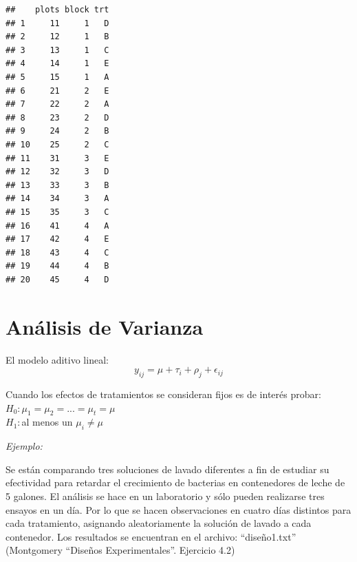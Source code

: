 \documentclass[]{book}
\newenvironment{Shaded}{\begin{snugshade}}{\end{snugshade}}
\newcommand{\KeywordTok}[1]{\textcolor[rgb]{0.13,0.29,0.53}{\textbf{#1}}}
\newcommand{\DataTypeTok}[1]{\textcolor[rgb]{0.13,0.29,0.53}{#1}}
\newcommand{\DecValTok}[1]{\textcolor[rgb]{0.00,0.00,0.81}{#1}}
\newcommand{\StringTok}[1]{\textcolor[rgb]{0.31,0.60,0.02}{#1}}
\newcommand{\CommentTok}[1]{\textcolor[rgb]{0.56,0.35,0.01}{\textit{#1}}}
\newcommand{\OperatorTok}[1]{\textcolor[rgb]{0.81,0.36,0.00}{\textbf{#1}}}
\newcommand{\NormalTok}[1]{#1}
\begin{document}
\begin{Shaded}
\end{Shaded}

\begin{verbatim}
##    plots block trt
## 1     11     1   D
## 2     12     1   B
## 3     13     1   C
## 4     14     1   E
## 5     15     1   A
## 6     21     2   E
## 7     22     2   A
## 8     23     2   D
## 9     24     2   B
## 10    25     2   C
## 11    31     3   E
## 12    32     3   D
## 13    33     3   B
## 14    34     3   A
## 15    35     3   C
## 16    41     4   A
## 17    42     4   E
## 18    43     4   C
## 19    44     4   B
## 20    45     4   D
\end{verbatim}

\section{Análisis de Varianza}\label{analisis-de-varianza-1}

El modelo aditivo lineal: \[y_{ij}=\mu + \tau_i+\rho_j+\epsilon_{ij}\]

Cuando los efectos de tratamientos se consideran fijos es de interés
probar:\\
\(H_0:\mu_1=\mu_2=... =\mu_t=\mu\)\\
\(H_1:\)al menos un \(\mu_i \neq \mu\)

\emph{Ejemplo:}

Se están comparando tres soluciones de lavado diferentes a fin de
estudiar su efectividad para retardar el crecimiento de bacterias en
contenedores de leche de 5 galones. El análisis se hace en un
laboratorio y sólo pueden realizarse tres ensayos en un día. Por lo que
se hacen observaciones en cuatro días distintos para cada tratamiento,
asignando aleatoriamente la solución de lavado a cada contenedor. Los
resultados se encuentran en el archivo: ``diseño1.txt'' (Montgomery
``Diseños Experimentales''. Ejercicio 4.2)
\end{document}
